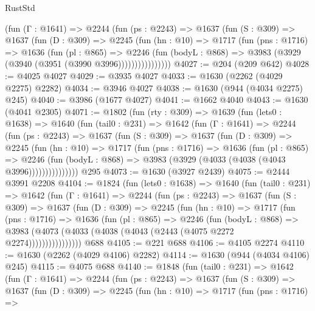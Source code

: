 \begin{lexlean}{RustStd}
\begin{coremodule}
            (fun (Γ : @1641) =>
            @2244
              (fun (ps : @2243) =>
              @1637
                (fun (S : @309) =>
                @1637
                  (fun (D : @309) =>
                  @2245
                    (fun (hn : @10) =>
                    @1717
                      (fun (pns : @1716) =>
                      @1636
                        (fun (pl : @865) =>
                        @2246
                          (fun (bodyL : @868) =>
                          @3983 (@3929 (@3940 (@3951 (@3990 @3996))))))))))))))))
@4027 := @204 (@209 @642)
@4028 := @4025 @4027
@4029 := @3935 @4027
@4033 := @1630 (@2262 (@4029 @2275) @2282)
@4034 := @3946 @4027
@4038 := @1630 (@944 (@4034 @2275) @245)
@4040 := @3986 (@1677 @4027)
@4041 := @1662 @4040
@4043 := @1630 (@4041 @2305)
@4071 := @1802
    (fun (rty : @309) =>
    @1639
      (fun (lets0 : @1638) =>
      @1640
        (fun (tail0 : @231) =>
        @1642
          (fun (Γ : @1641) =>
          @2244
            (fun (ps : @2243) =>
            @1637
              (fun (S : @309) =>
              @1637
                (fun (D : @309) =>
                @2245
                  (fun (hn : @10) =>
                  @1717
                    (fun (pns : @1716) =>
                    @1636
                      (fun (pl : @865) =>
                      @2246
                        (fun (bodyL : @868) =>
                        @3983 (@3929 (@4033 (@4038 (@4043 @3996)))))))))))))))
    @295
@4073 := @1630 (@3927 @2439)
@4075 := @2444 @3991 @2208
@4104 := @1824
    (fun (lets0 : @1638) =>
    @1640
      (fun (tail0 : @231) =>
      @1642
        (fun (Γ : @1641) =>
        @2244
          (fun (ps : @2243) =>
          @1637
            (fun (S : @309) =>
            @1637
              (fun (D : @309) =>
              @2245
                (fun (hn : @10) =>
                @1717
                  (fun (pns : @1716) =>
                  @1636
                    (fun (pl : @865) =>
                    @2246
                      (fun (bodyL : @868) =>
                      @3983 (@4073 (@4033 (@4038 (@4043 (@2443 (@4075 @2272 @2274))))))))))))))))
    @688
@4105 := @221 @688
@4106 := @4105 @2274
@4110 := @1630 (@2262 (@4029 @4106) @2282)
@4114 := @1630 (@944 (@4034 @4106) @245)
@4115 := @4075 @688
@4140 := @1848
    (fun (tail0 : @231) =>
    @1642
      (fun (Γ : @1641) =>
      @2244
        (fun (ps : @2243) =>
        @1637
          (fun (S : @309) =>
          @1637
            (fun (D : @309) =>
            @2245
              (fun (hn : @10) =>
              @1717
                (fun (pns : @1716) =>

\end{coremodule}
\end{lexlean}
